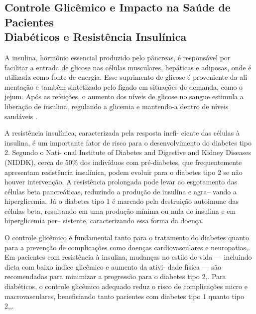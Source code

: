 \documentclass[conference]{IEEEtran}
\begin{document}
\subsection{Controle Glicêmico e Impacto na Saúde de Pacientes \\Diabéticos e Resistência Insulínica}
\sloppy
A insulina, hormônio essencial produzido pelo pâncreas, 
é responsável por facilitar a entrada de glicose nas células musculares, 
hepáticas e adiposas, onde é utilizada como fonte de 
energia. Esse suprimento de glicose é proveniente da ali-mentação 
e também sintetizado pelo fígado em situações de 
demanda, como o jejum. Após as refeições, o aumento dos 
níveis de glicose no sangue estimula a liberação de insulina, 
regulando a glicemia e mantendo-a dentro de níveis saudáveis
\cite{b20}. 
\par
A resistência insulínica, caracterizada pela resposta inefi-
ciente das células à insulina, é um importante fator de risco
para o desenvolvimento do diabetes tipo 2. Segundo o Nati-
onal Institute of Diabetes and Digestive and Kidney Diseases
(NIDDK), cerca de 50\% dos indivíduos com pré-diabetes, 
que frequentemente apresentam resistência insulínica, podem 
evoluir para o diabetes tipo 2 se não houver intervenção\cite{b20}. A 
resistência prolongada pode levar ao esgotamento das células
beta pancreáticas, reduzindo a produção de insulina e agra--
vando a hiperglicemia\cite{b21}. Já o diabetes tipo 1 é marcado
pela destruição autoimune das células beta, resultando em uma 
produção mínima ou nula de insulina e em hiperglicemia per--
sistente, caracterizando essa forma da doença\cite{b22}.
\par
O controle glicêmico é fundamental tanto para o tratamento 
do diabetes quanto para a prevenção de complicações como 
doenças cardiovasculares e neuropatias\cite{b1},\cite{b12}. Em pacientes 
com resistência à insulina, mudanças no estilo de vida —
incluindo dieta  com baixo índice glicêmico e aumento da ativi-
dade física — são recomendadas para minimizar a progressão 
para o diabetes tipo 2\cite{b11},\cite{b5}. Para diabéticos, o controle 
glicêmico adequado reduz o risco de complicações micro e
macrovasculares, beneficiando tanto pacientes com diabetes tipo 1 quanto 
tipo 2\cite{b1},\cite{b12},\cite{b13}.
\fussy
\end{document}
